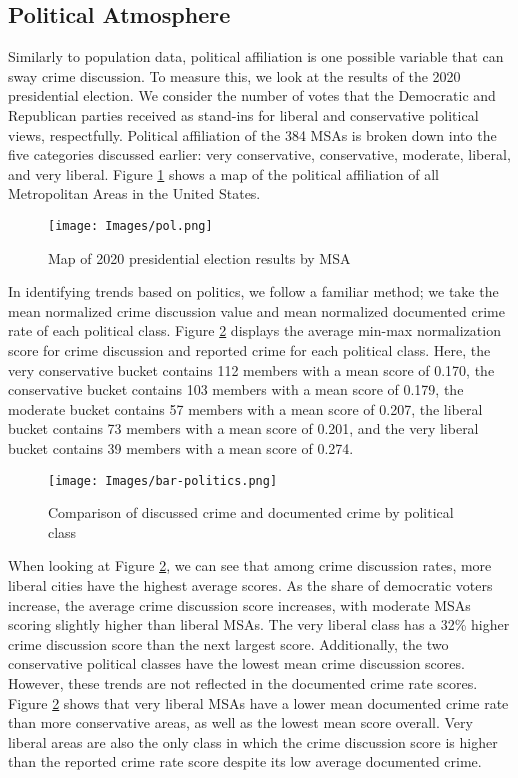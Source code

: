 \documentclass[12pt,oneside, letterpaper]{book}
\begin{document}
\subsection{Political Atmosphere}

\par Similarly to population data, political affiliation is one possible variable that can sway crime discussion. To measure this, we look at the results of the 2020 presidential election. We consider the number of votes that the Democratic and Republican parties received as stand-ins for liberal and conservative political views, respectfully. Political affiliation of the 384 MSAs is broken down into the five categories discussed earlier: very conservative, conservative, moderate, liberal, and very liberal. Figure \ref{fig:map-2} shows a map of the political affiliation of all Metropolitan Areas in the United States.

\begin{figure}[ht]
    \texttt{[image: Images/pol.png]}
    \caption{Map of 2020 presidential election results by MSA}
    \label{fig:map-2}
\end{figure}

\par In identifying trends based on politics, we follow a familiar method; we take the mean normalized crime discussion value and mean normalized documented crime rate of each political class. Figure \ref{fig:graph-2} displays the average min-max normalization score for crime discussion and reported crime for each political class. Here, the very conservative bucket contains 112 members with a mean score of 0.170, the conservative bucket contains 103 members with a mean score of 0.179, the moderate bucket contains 57 members with a mean score of 0.207, the liberal bucket contains 73 members with a mean score of 0.201, and the very liberal bucket contains 39 members with a mean score of 0.274.

\begin{figure}[ht]
    \centering
    \texttt{[image: Images/bar-politics.png]}
    \caption{Comparison of discussed crime and documented crime by political class}
    \label{fig:graph-2}
\end{figure}

\par When looking at Figure \ref{fig:graph-2}, we can see that among crime discussion rates, more liberal cities have the highest average scores. As the share of democratic voters increase, the average crime discussion score increases, with moderate MSAs scoring slightly higher than liberal MSAs. The very liberal class has a 32\% higher crime discussion score than the next largest score. Additionally, the two conservative political classes have the lowest mean crime discussion scores. However, these trends are not reflected in the documented crime rate scores. Figure \ref{fig:graph-2} shows that very liberal MSAs have a lower mean documented crime rate than more conservative areas, as well as the lowest mean score overall. Very liberal areas are also the only class in which the crime discussion score is higher than the reported crime rate score despite its low average documented crime.
\end{document}
